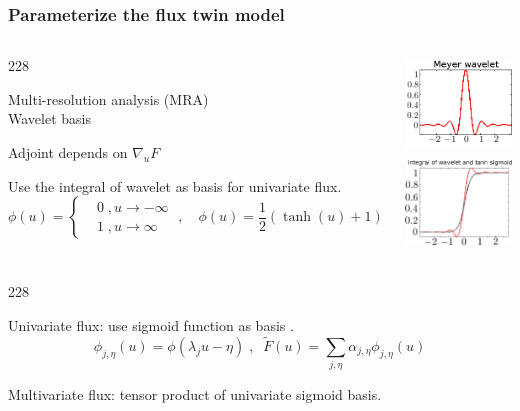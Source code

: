 \documentclass{beamer}
\let\oldcite=\cite
\renewcommand{\cite}[1]{\textcolor[rgb]{.4,.4,.85}{\oldcite{#1}}}
\newcommand{\barrow}{\item[\color{darkred}\ding{228}]}
\begin{document}
\begin{frame}
    \frametitle{Parameterize the flux \hfill \scriptsize{twin model}}\small
    \begin{columns}
    \begin{dinglist}{228}
        \barrow Multi-resolution analysis (MRA) \scriptsize{\cite{Mallat 89}}\small\\
                Wavelet basis
        \barrow Adjoint depends on $\nabla_u F$
        \barrow Use the integral of wavelet as basis for univariate flux.
                \begin{equation*}
                    \phi(u) = \left\{
                    \begin{split}
                        &0\;, u\rightarrow -\infty\\
                        &1\;, u\rightarrow \infty
                    \end{split}
                    \right.\;,
                 \quad
                 \phi(u) = \frac{1}{2}\left(\tanh (u) + 1\right) 
                \end{equation*}
   \end{dinglist}
   \includegraphics[height=2.5cm]{meyer_2.png}\\
   \includegraphics[height=2.5cm]{basis_combined.png}
   \end{columns}
   
   \begin{dinglist}{228}
        \barrow Univariate flux: use sigmoid function as basis \scriptsize\cite{Mhaskar 92} \small.
             $$
                 \phi_{j,\eta}(u) = \phi(\lambda_j u-\eta)\;,\;\;
                 \tilde{F}(u) = \sum_{j,\eta} \alpha_{j,\eta}\phi_{j,\eta}(u)
             $$
        \barrow
             Multivariate flux: 
             tensor product of univariate sigmoid basis.
    \end{dinglist}
\end{frame}
\end{document}
